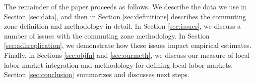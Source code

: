 The remainder of the paper proceeds as follows. We describe the data we use in Section \ref{sec:data}, and then in Section \ref{sec:definitions} describes the commuting zone definition and methodology in detail. In Section \ref{sec:issues}, we discuss a number of issues with the commuting zone methodology. In Section \ref{sec:adhreplication}, we demonstrate how these issues impact empirical estimates. Finally, in Sections \ref{sec:objfn} and \ref{sec:ourmeth}, we discuss our measure of local labor market integration and methodology for defining local labor markets. Section \ref{sec:conclusion} summarizes and discusses next steps. 


